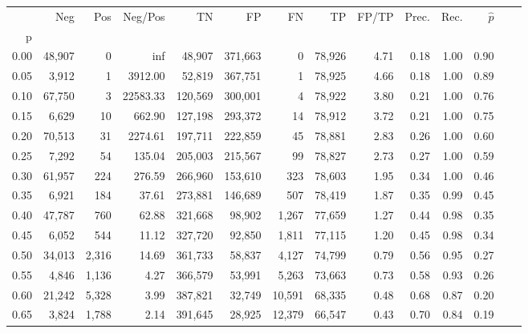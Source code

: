 \begin{tabular}{rrrrrrrrrrrrrr}
\toprule
{} &     Neg &     Pos &   Neg/Pos &       TN &       FP &      FN &      TP & FP/TP & Prec. &  Rec. & $\hat{p}$ \\
p    &         &         &           &          &          &         &         &       &       &       &           \\
\midrule
0.00 &  48,907 &       0 &       inf &   48,907 &  371,663 &       0 &  78,926 &  4.71 &  0.18 &  1.00 &      0.90 \\
0.05 &   3,912 &       1 &   3912.00 &   52,819 &  367,751 &       1 &  78,925 &  4.66 &  0.18 &  1.00 &      0.89 \\
0.10 &  67,750 &       3 &  22583.33 &  120,569 &  300,001 &       4 &  78,922 &  3.80 &  0.21 &  1.00 &      0.76 \\
0.15 &   6,629 &      10 &    662.90 &  127,198 &  293,372 &      14 &  78,912 &  3.72 &  0.21 &  1.00 &      0.75 \\
0.20 &  70,513 &      31 &   2274.61 &  197,711 &  222,859 &      45 &  78,881 &  2.83 &  0.26 &  1.00 &      0.60 \\
0.25 &   7,292 &      54 &    135.04 &  205,003 &  215,567 &      99 &  78,827 &  2.73 &  0.27 &  1.00 &      0.59 \\
0.30 &  61,957 &     224 &    276.59 &  266,960 &  153,610 &     323 &  78,603 &  1.95 &  0.34 &  1.00 &      0.46 \\
0.35 &   6,921 &     184 &     37.61 &  273,881 &  146,689 &     507 &  78,419 &  1.87 &  0.35 &  0.99 &      0.45 \\
0.40 &  47,787 &     760 &     62.88 &  321,668 &   98,902 &   1,267 &  77,659 &  1.27 &  0.44 &  0.98 &      0.35 \\
0.45 &   6,052 &     544 &     11.12 &  327,720 &   92,850 &   1,811 &  77,115 &  1.20 &  0.45 &  0.98 &      0.34 \\
0.50 &  34,013 &   2,316 &     14.69 &  361,733 &   58,837 &   4,127 &  74,799 &  0.79 &  0.56 &  0.95 &      0.27 \\
0.55 &   4,846 &   1,136 &      4.27 &  366,579 &   53,991 &   5,263 &  73,663 &  0.73 &  0.58 &  0.93 &      0.26 \\
0.60 &  21,242 &   5,328 &      3.99 &  387,821 &   32,749 &  10,591 &  68,335 &  0.48 &  0.68 &  0.87 &      0.20 \\
0.65 &   3,824 &   1,788 &      2.14 &  391,645 &   28,925 &  12,379 &  66,547 &  0.43 &  0.70 &  0.84 &      0.19 \\

\end{tabular}
